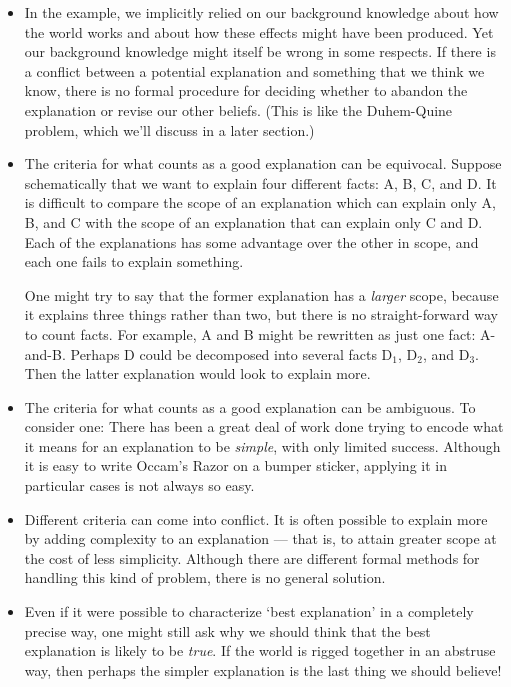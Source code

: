 \documentclass[]{article}
\begin{document}
\begin{itemize}
\item
In the example, we implicitly relied on our background knowledge about how the world works and about how these effects might have been produced. Yet our background knowledge might itself be wrong in some respects. If there is a conflict between a potential explanation and something that we think we know, there is no formal procedure for deciding whether to abandon the explanation or revise our other beliefs. (This is like the Duhem-Quine problem, which we'll discuss in a later section.)
\item
The criteria for what counts as a good explanation can be equivocal. Suppose schematically that we want to explain four different facts: A, B, C, and D. It is difficult to compare the scope of an explanation which can explain only A, B, and C with the scope of an explanation that can explain only C and D. Each of the explanations has some advantage over the other in scope, and each one fails to explain something.

One might try to say that the former explanation has a \emph{larger} scope, because it explains three things rather than two, but there is no straight-forward way to count facts. For example, A and B might be rewritten as just one fact: A-and-B. Perhaps D could be decomposed into several facts D$_{1}$, D$_{2}$, and D$_{3}$. Then the latter explanation would look to explain more.
\item
The criteria for what counts as a good explanation can be ambiguous. To consider one: There has been a great deal of work done trying to encode what it means for an explanation to be \emph{simple}, with only limited success. Although it is easy to write Occam's Razor on a bumper sticker, applying it in particular cases is not always so easy.
\item
Different criteria can come into conflict. It is often possible to explain more by adding complexity to an explanation --- that is, to attain greater scope at the cost of less simplicity. Although there are different formal methods for handling this kind of problem, there is no general solution.
\item
Even if it were possible to characterize `best explanation' in a completely precise way, one might still ask why we should think that the best explanation is likely to be \emph{true}. If the world is rigged together in an abstruse way, then perhaps the simpler explanation is the last thing we should believe!
\end{itemize}
\end{document}
